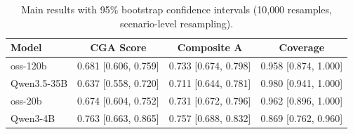 \begin{table}[htbp]
\centering
\caption{Main results with 95\% bootstrap confidence intervals (10{,}000 resamples, scenario-level resampling).}
\label{tab:main_results_ci}
\begin{tabular}{lccc}
\toprule
Model & CGA Score & Composite A & Coverage \\
\midrule
oss-120b & 0.681 [0.606, 0.759] & 0.733 [0.674, 0.798] & 0.958 [0.874, 1.000] \\
Qwen3.5-35B & 0.637 [0.558, 0.720] & 0.711 [0.644, 0.781] & 0.980 [0.941, 1.000] \\
oss-20b & 0.674 [0.604, 0.752] & 0.731 [0.672, 0.796] & 0.962 [0.896, 1.000] \\
Qwen3-4B & 0.763 [0.663, 0.865] & 0.757 [0.688, 0.832] & 0.869 [0.762, 0.960] \\
\bottomrule
\end{tabular}
\end{table}